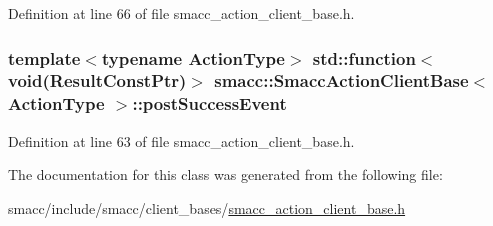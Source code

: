 Definition at line 66 of file smacc\+\_\+action\+\_\+client\+\_\+base.\+h.

\subsubsection[{\texorpdfstring{post\+Success\+Event}{postSuccessEvent}}]{\setlength{\rightskip}{0pt plus 5cm}template$<$typename Action\+Type$>$ std\+::function$<$void(Result\+Const\+Ptr)$>$ {\bf smacc\+::\+Smacc\+Action\+Client\+Base}$<$ Action\+Type $>$\+::post\+Success\+Event}\hypertarget{classsmacc_1_1SmaccActionClientBase_afa4343d33f5c10b54a98c875b5a37b04}{}\label{classsmacc_1_1SmaccActionClientBase_afa4343d33f5c10b54a98c875b5a37b04}


Definition at line 63 of file smacc\+\_\+action\+\_\+client\+\_\+base.\+h.



The documentation for this class was generated from the following file\+:\begin{DoxyCompactItemize}
\item 
smacc/include/smacc/client\+\_\+bases/\hyperlink{smacc__action__client__base_8h}{smacc\+\_\+action\+\_\+client\+\_\+base.\+h}\end{DoxyCompactItemize}
